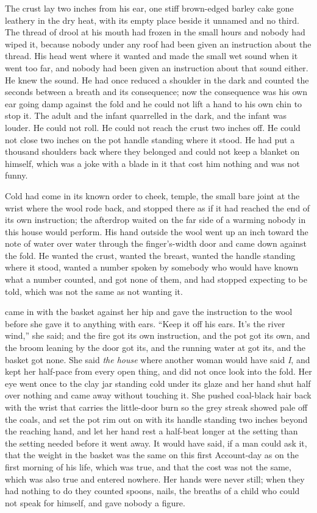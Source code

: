 The crust lay two inches from his ear, one stiff brown-edged barley cake gone leathery in the dry heat, with its empty place beside it unnamed and no third. The thread of drool at his mouth had frozen in the small hours and nobody had wiped it, because nobody under any roof had been given an instruction about the thread. His head went where it wanted and made the small wet sound when it went too far, and nobody had been given an instruction about that sound either. He knew the sound. He had once reduced a shoulder in the dark and counted the seconds between a breath and its consequence; now the consequence was his own ear going damp against the fold and he could not lift a hand to his own chin to stop it. The adult and the infant quarrelled in the dark, and the infant was louder. He could not roll. He could not reach the crust two inches off. He could not close two inches on the pot handle standing where it stood. He had put a thousand shoulders back where they belonged and could not keep a blanket on himself, which was a joke with a blade in it that cost him nothing and was not funny.

Cold had come in its known order to cheek, temple, the small bare joint at the wrist where the wool rode back, and stopped there as if it had reached the end of its own instruction; the afterdrop waited on the far side of a warming nobody in this house would perform. His hand outside the wool went up an inch toward the note of water over water through the finger's-width door and came down against the fold. He wanted the crust, wanted the breast, wanted the handle standing where it stood, wanted a number spoken by somebody who would have known what a number counted, and got none of them, and had stopped expecting to be told, which was not the same as not wanting it.

 came in with the basket against her hip and gave the instruction to the wool before she gave it to anything with ears. “Keep it off his ears. It's the river wind,” she said; and the fire got its own instruction, and the pot got its own, and the broom leaning by the door got its, and the running water at  got its, and the basket got none. She said \emph{the house} where another woman would have said \emph{I}, and kept her half-pace from every open thing, and did not once look into the fold. Her eye went once to the clay jar standing cold under its glaze and her hand shut half over nothing and came away without touching it. She pushed coal-black hair back with the wrist that carries the little-door burn so the grey streak showed pale off the coals, and set the pot rim out on  with its handle standing two inches beyond the reaching hand, and let her hand rest a half-beat longer at the setting than the setting needed before it went away. It would have said, if a man could ask it, that the weight in the basket was the same on this first Account-day as on the first morning of his life, which was true, and that the cost was not the same, which was also true and entered nowhere. Her hands were never still; when they had nothing to do they counted spoons, nails, the breaths of a child who could not speak for himself, and gave nobody a figure.

